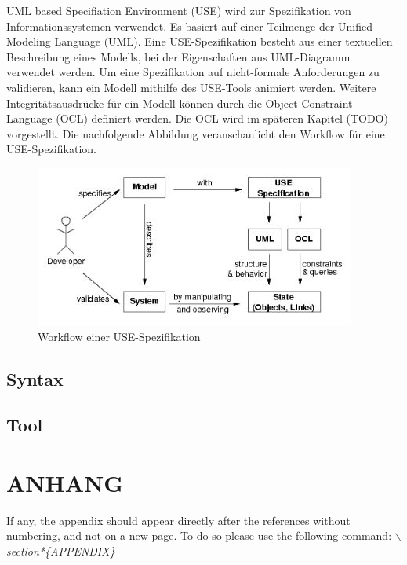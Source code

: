 \documentclass[a4paper,twoside]{article}
\begin{document}
UML based Specifiation Environment (USE) wird zur Spezifikation von Informationssystemen verwendet. Es basiert auf einer Teilmenge der Unified Modeling Language (UML). Eine USE-Spezifikation besteht aus einer textuellen Beschreibung eines Modells, bei der Eigenschaften aus UML-Diagramm verwendet werden. Um eine Spezifikation auf nicht-formale Anforderungen zu validieren, kann ein Modell mithilfe des USE-Tools animiert werden. Weitere Integritätsausdrücke für ein Modell können durch die Object Constraint Language (OCL) definiert werden. Die OCL wird im späteren Kapitel (TODO) vorgestellt. Die nachfolgende Abbildung veranschaulicht den Workflow für eine USE-Spezifikation.

\begin{figure}
	\includegraphics[scale=.7]{pics/USE_workflow.jpg}
	\caption{Workflow einer USE-Spezifikation}
\end{figure}

\subsection{Syntax}

\subsection{Tool}

\vfill

{\small
}

\section*{\uppercase{Anhang}}

\noindent If any, the appendix should appear directly after the
references without numbering, and not on a new page. To do so please use the following command:
\textit{$\backslash$section*\{APPENDIX\}}


\vfill
\end{document}

